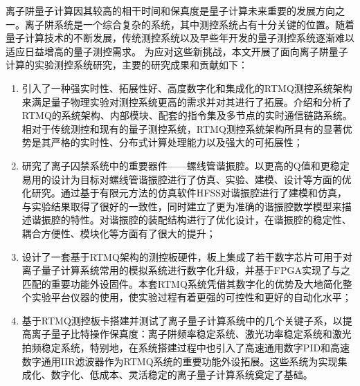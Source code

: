 
\begin{conclusion}

离子阱量子计算因其较高的相干时间和保真度是量子计算未来重要的发展方向之一。离子阱系统是一个综合复杂的系统，其中测控系统占有十分关键的位置。随着量子计算技术的不断发展，传统测控系统以及早些年开发的量子测控系统逐渐难以适应日益增高的量子测控需求。
为应对这些新挑战，本文开展了面向离子阱量子计算的实验测控系统研究，主要的研究成果和贡献如下：
\begin{enumerate}
    \item 引入了一种强实时性、拓展性好、高度数字化和集成化的RTMQ测控系统架构来满足量子物理实验对测控系统更高的需求并对其进行了拓展。介绍和分析了RTMQ的系统架构、内部模块、配套的指令集及多节点的实时通信链路系统。相对于传统测控和现有的量子测控系统，RTMQ测控系统架构所具有的显著优势是其严格的实时性、分布式计算处理能力以及强大的可拓展性；
    \item 研究了离子囚禁系统中的重要器件——螺线管谐振腔。以更高的Q值和更稳定易用的设计为目标对螺线管谐振腔进行了仿真、实验、建模、设计等方面的优化研究。通过基于有限元方法的仿真软件HFSS对谐振腔进行了建模和仿真，与实验结果取得了很好的一致性，同时建立了更为准确的谐振腔数学模型来描述谐振腔的特性。对谐振腔的装配结构进行了优化设计，在谐振腔的稳定性、耦合方便性、模块化等方面有了很大的提升；
    \item 设计了一套基于RTMQ架构的测控板硬件，板上集成了若干数字芯片可用于对离子量子计算系统常用的模拟系统进行数字化升级，并基于FPGA实现了与之匹配的重要功能外设固件。本套RTMQ系统凭借其数字化的优势及大地简化整个实验平台仪器的使用，使实验过程有着更强的可控性和更好的自动化水平；
    \item 基于RTMQ测控板卡搭建并测试了离子量子计算系统中的几个关键子系，以提高离子量子比特操作保真度：离子阱频率稳定系统、激光功率稳定系统和激光拍频稳定系统，特别地，在系统搭建过程中也引入了高速通用数字PID和高速数字通用IIR滤波器作为RTMQ系统的重要功能外设拓展。这些系统为实现集成化、数字化、低成本、灵活稳定的离子量子计算系统奠定了基础。
\end{enumerate}



\end{conclusion}
